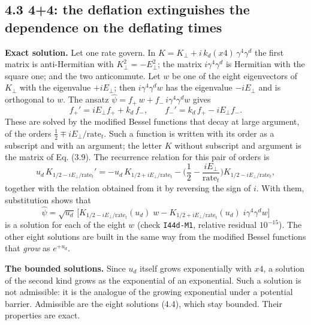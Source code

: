 \documentclass[
  10pt,
]{article}
\begin{document}
\hypertarget{the-deflation-extinguishes-the-dependence-on-the-deflating-times}{%
\subsection{4.3 4+4: the deflation extinguishes the dependence on the
deflating
times}\label{the-deflation-extinguishes-the-dependence-on-the-deflating-times}}

\textbf{Exact solution.} Let one rate govern. In
\(K=K_\perp+i\,k_d(x4)\,\gamma^4\gamma^d\) the first matrix is
anti-Hermitian with \(K_\perp^2=-E_\perp^2\); the matrix
\(i\gamma^4\gamma^d\) is Hermitian with the square one; and the two
anticommute. Let \(w\) be one of the eight eigenvectors of \(K_\perp\)
with the eigenvalue \(+iE_\perp\); then \(i\gamma^4\gamma^dw\) has the
eigenvalue \(-iE_\perp\) and is orthogonal to \(w\). The ansatz
\(\hat\psi=f_+\,w+f_-\,i\gamma^4\gamma^dw\) gives
\[f_+'=iE_\perp f_++k_d\,f_-,\qquad f_-'=k_d\,f_+-iE_\perp f_- .\] These
are solved by the modified Bessel functions that decay at large
argument, of the orders \(\tfrac12\mp iE_\perp/\mathrm{rate}_t\). Such a
function is written with its order as a subscript and with an argument;
the letter \(K\) without subscript and argument is the matrix of Eq.
(3.9). The recurrence relation for this pair of orders is
\[u_d\,K_{1/2-iE_\perp/\mathrm{rate}_t}'=-u_d\,K_{1/2+iE_\perp/\mathrm{rate}_t}
-\Big(\frac12-\frac{iE_\perp}{\mathrm{rate}_t}\Big)K_{1/2-iE_\perp/\mathrm{rate}_t},\]
together with the relation obtained from it by reversing the sign of
\(i\). With them, substitution shows that
\[\boxed{\;\hat\psi=\sqrt{u_d}\,\Big[K_{1/2-iE_\perp/\mathrm{rate}_t}(u_d)\;w
-K_{1/2+iE_\perp/\mathrm{rate}_t}(u_d)\;i\gamma^4\gamma^dw\Big]\;}\tag{4.4}\]
is a solution for each of the eight \(w\) (check \texttt{I44d-M1},
relative residual \(10^{-15}\)). The other eight solutions are built in
the same way from the modified Bessel functions that \emph{grow} as
\(e^{+u_d}\).

\textbf{The bounded solutions.} Since \(u_d\) itself grows exponentially
with \(x4\), a solution of the second kind grows as the exponential of
an exponential. Such a solution is not admissible: it is the analogue of
the growing exponential under a potential barrier. Admissible are the
eight solutions (4.4), which stay bounded. Their properties are exact.
\end{document}
